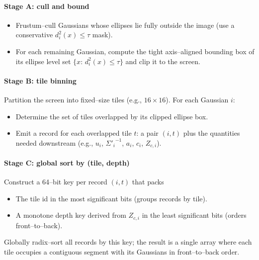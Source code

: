 \begin{enrichment}
\begin{enrichment}
\begin{enrichment}
        \paragraph{Stage A: cull and bound}
        \begin{itemize}
            \item Frustum–cull Gaussians whose ellipses lie fully outside the image (use a conservative $d_i^2(x)\le \tau$ mask).
            \item For each remaining Gaussian, compute the tight axis–aligned bounding box of its ellipse level set $\{x:\,d_i^2(x)\le \tau\}$ and clip it to the screen.
        \end{itemize}
        
        \newpage
        
        \paragraph{Stage B: tile binning}
        Partition the screen into fixed–size tiles (e.g., $16{\times}16$). For each Gaussian $i$:
        \begin{itemize}
            \item Determine the set of tiles overlapped by its clipped ellipse box.
            \item Emit a record for each overlapped tile $t$: a pair $(i,t)$ plus the quantities needed downstream (e.g., $u_i$, ${\Sigma'_i}^{-1}$, $a_i$, $c_i$, $Z_{c,i}$).
        \end{itemize}
        
        \paragraph{Stage C: global sort by (tile, depth)}
        Construct a 64–bit key per record $(i,t)$ that packs
        \begin{itemize}
            \item The tile id in the most significant bits (groups records by tile).
            \item A monotone depth key derived from $Z_{c,i}$ in the least significant bits (orders front–to–back).
        \end{itemize}
        Globally radix–sort all records by this key; the result is a single array where each tile occupies a contiguous segment with its Gaussians in front–to–back order.
        

\end{enrichment}
\end{enrichment}
\end{enrichment}
